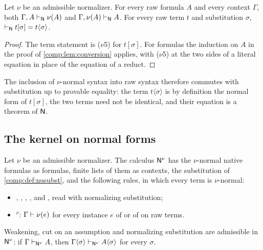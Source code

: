 \begin{lemma}
\label{comp:lem:nusound}
Let $\nu$ be an admissible normalizer. For every raw formula $A$ and every
context $\Gamma$, both $\Gamma,A\vdash_{\mathsf{N}}\nu(A)$ and
$\Gamma,\nu(A)\vdash_{\mathsf{N}}A$. For every raw term $t$ and substitution
$\sigma$, $\vdash_{\mathsf{N}}t[\sigma]=t\langle\sigma\rangle$.
\end{lemma}

\begin{proof}
The term statement is ($\nu$5) for $t[\sigma]$. For formulas the induction
on $A$ in the proof of \cref{comp:lem:conversion} applies, with ($\nu$5) at
the two sides of a literal equation in place of the equation of a reduct.
\end{proof}

The inclusion of $\nu$-normal syntax into raw syntax therefore commutes with
substitution up to provable equality: the term $t\langle\sigma\rangle$ is
by definition the normal form of $t[\sigma]$, the two terms need not be
identical, and their equation is a theorem of $\mathsf{N}$.

\subsection{The kernel on normal forms}

\begin{definition}
\label{comp:def:nukernel}
Let $\nu$ be an admissible normalizer. The calculus $\mathsf{N}^{\nu}$ has the
$\nu$-normal native formulas as formulas, finite lists of them as contexts,
the substitution of \cref{comp:def:nusubst}, and the following rules, in
which every term is $\nu$-normal:
\begin{itemize}
\item {}, , , ,
  and , read with normalizing substitution;
\item {}$^{\nu}$: $\Gamma\vdash\nu(e)$ for every instance $e$
 of  or of  on raw terms.
\end{itemize}
\end{definition}

\begin{lemma}
\label{comp:lem:nustruct}
Weakening, cut on an assumption and normalizing substitution are admissible
in $\mathsf{N}^{\nu}$: if $\Gamma\vdash_{\mathsf{N}^{\nu}}A$, then
$\Gamma\langle\sigma\rangle\vdash_{\mathsf{N}^{\nu}}A\langle\sigma\rangle$ for
every $\sigma$.
\end{lemma}

